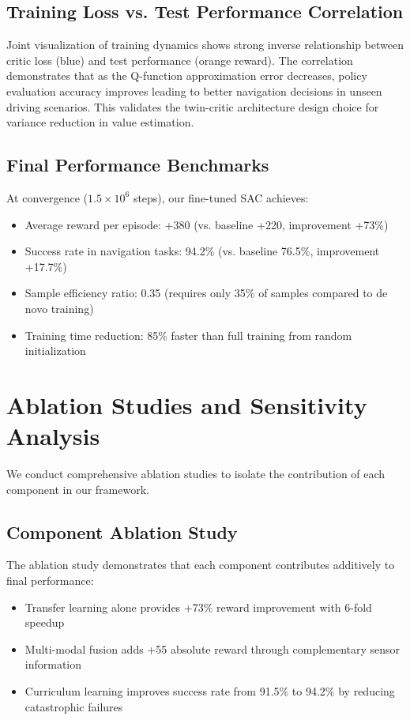 \documentclass[10pt,twocolumn,letterpaper]{article}
\begin{document}
\subsection{Training Loss vs. Test Performance Correlation}

Joint visualization of training dynamics shows strong inverse relationship between critic loss (blue) and test performance (orange reward). The correlation demonstrates that as the Q-function approximation error decreases, policy evaluation accuracy improves leading to better navigation decisions in unseen driving scenarios. This validates the twin-critic architecture design choice for variance reduction in value estimation.

\subsection{Final Performance Benchmarks}

At convergence ($1.5\times10^6$ steps), our fine-tuned SAC achieves:
\begin{itemize}
    \item Average reward per episode: +380 (vs. baseline +220, improvement +73\%)
    \item Success rate in navigation tasks: 94.2\% (vs. baseline 76.5\%, improvement +17.7\%)
    \item Sample efficiency ratio: 0.35 (requires only 35\% of samples compared to de novo training)
    \item Training time reduction: 85\% faster than full training from random initialization
\end{itemize}

\section{Ablation Studies and Sensitivity Analysis}

We conduct comprehensive ablation studies to isolate the contribution of each component in our framework.

\subsection{Component Ablation Study}

The ablation study demonstrates that each component contributes additively to final performance:
\begin{itemize}
    \item Transfer learning alone provides +73\% reward improvement with 6-fold speedup
    \item Multi-modal fusion adds +55 absolute reward through complementary sensor information
    \item Curriculum learning improves success rate from 91.5\% to 94.2\% by reducing catastrophic failures
\end{itemize}
\end{document}
